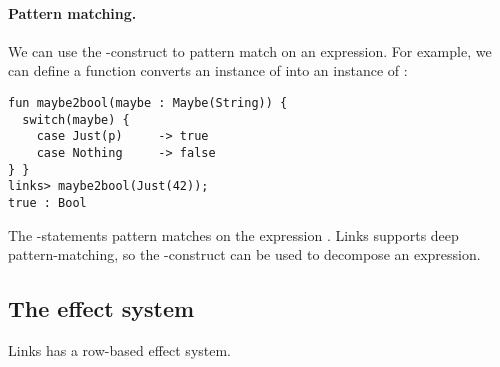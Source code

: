 \paragraph{Pattern matching.} We can use the -construct to pattern match on an expression. For example, we can define a function converts an instance of  into an instance of :
\begin{lstlisting}[style=links]
fun maybe2bool(maybe : Maybe(String)) {
  switch(maybe) {
    case Just(p)     -> true
    case Nothing     -> false
} }
links> maybe2bool(Just(42));
true : Bool
\end{lstlisting}
The -statements pattern matches on the expression . Links supports deep pattern-matching, so the -construct can be used to decompose an expression.

\subsection{The effect system}
Links has a row-based effect system.